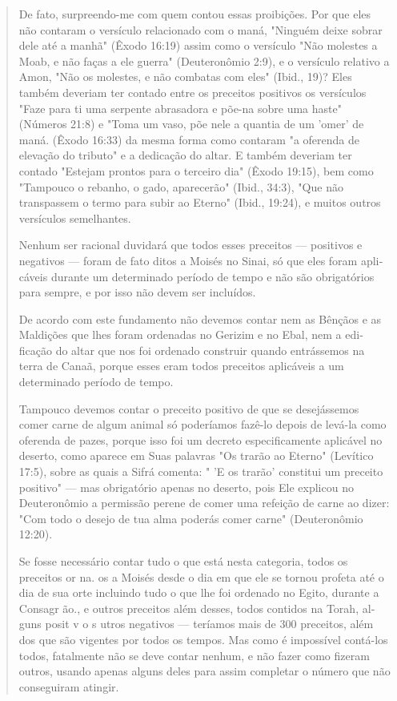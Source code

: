 \begin{quote}
De fato, surpreendo-me com quem contou essas proibições. Por que eles
não contaram o versículo relacionado com o maná, "Ninguém deixe so­brar
dele até a manhã" (Êxodo 16:19) assim como o versículo "Não molestes a
Moab, e não faças a ele guerra" (Deuteronômio 2:9), e o versículo
relativo a Amon, "Não os molestes, e não combatas com eles" (Ibid., 19)?
Eles também deveriam ter contado entre os preceitos positivos os
versículos "Faze para ti uma serpente abrasadora e põe-na sobre uma
haste" (Números 21:8) e "Toma um vaso, põe nele a quantia de um 'omer'
de maná. (Êxodo 16:33) da mesma forma como contaram "a
oferenda de elevação do tributo" e a dedicação do altar. E também
deveriam ter contado "Estejam prontos para o terceiro dia" (Êxodo
19:15), bem como "Tampouco o rebanho, o gado, aparecerão" (Ibid., 34:3),
"Que não transpassem o termo para subir ao Eterno" (Ibid., 19:24), e
muitos outros versículos semelhantes.

Nenhum ser racional duvidará que todos esses preceitos --- positi­vos e
negativos --- foram de fato ditos a Moisés no Sinai, só que eles foram
apli­cáveis durante um determinado período de tempo e não são
obrigatórios para sempre, e por isso não devem ser incluídos.

De acordo com este fundamento não devemos contar nem as Bênçãos 
e as Maldições que lhes foram ordenadas no Gerizim e no Ebal, nem a
edi­ficação do altar que nos foi ordenado construir quando entrássemos
na terra de Canaã, porque esses eram todos preceitos aplicáveis a um
determinado pe­ríodo de tempo.

Tampouco devemos contar o preceito positivo de que se desejásse­mos
comer carne de algum animal só poderíamos fazê-lo depois de levá-la
co­mo oferenda de pazes, porque isso foi um decreto especificamente
aplicável no deserto, como aparece em Suas palavras "Os trarão ao
Eterno" (Levítico 17:5), sobre as quais a Sifrá comenta: " 'E os trarão'
constitui um preceito positivo" --- mas obrigatório apenas no deserto,
pois Ele explicou no Deuteronômio a permissão perene de comer uma
refeição de carne ao dizer: "Com todo o dese­jo de tua alma poderás
comer carne" (Deuteronômio 12:20).

Se fosse necessário contar tudo o que está nesta categoria, todos os
preceitos or na. os a Moisés desde o dia em que ele se tornou profeta
até o dia de sua orte incluindo tudo o que lhe foi ordenado no Egito,
durante a Consagr ão., e outros preceitos além desses,
todos contidos na Torah, al­guns posit v o s utros negativos ---
teríamos mais de 300 preceitos, além dos que são vigentes por todos os
tempos. Mas como é impossível contá-los todos, fatalmente não se deve
contar nenhum, e não fazer como fizeram outros, usan­do apenas alguns
deles para assim completar o número que não conseguiram atingir.


\end{quote}
